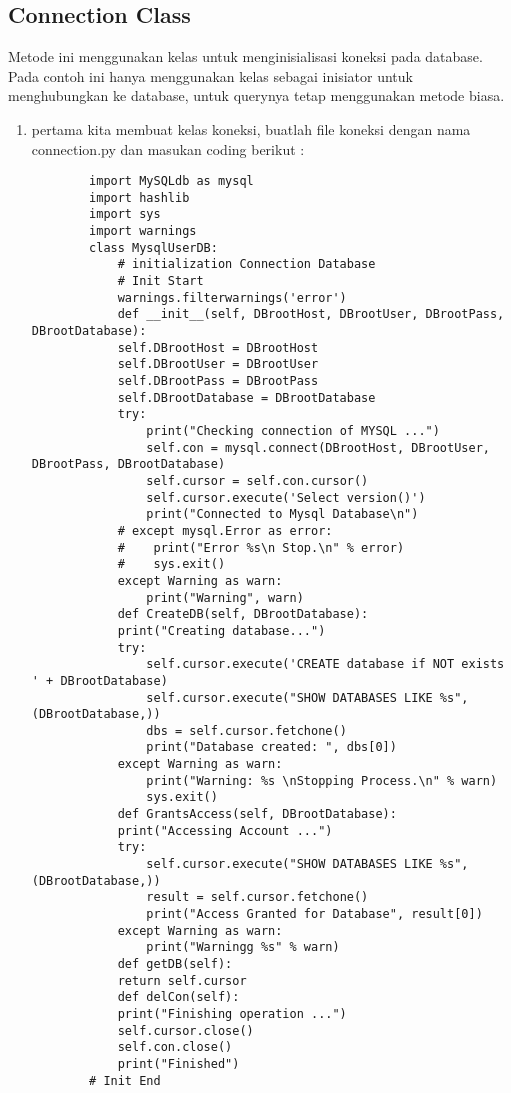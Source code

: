 \begin{enumerate}
\begin{enumerate}
\subsection {Connection Class}
	Metode ini menggunakan kelas untuk menginisialisasi koneksi pada database. Pada contoh ini hanya menggunakan kelas sebagai inisiator untuk menghubungkan ke database, untuk querynya tetap menggunakan metode biasa.
	\begin{enumerate}
	\item pertama kita membuat kelas koneksi, buatlah file koneksi dengan nama connection.py dan masukan coding berikut :
		\begin{verbatim}
		import MySQLdb as mysql
		import hashlib
		import sys
		import warnings
		class MysqlUserDB:
    		# initialization Connection Database
    		# Init Start
    		warnings.filterwarnings('error')
    		def __init__(self, DBrootHost, DBrootUser, DBrootPass, DBrootDatabase):
        	self.DBrootHost = DBrootHost
        	self.DBrootUser = DBrootUser
        	self.DBrootPass = DBrootPass
        	self.DBrootDatabase = DBrootDatabase
        	try:
            	print("Checking connection of MYSQL ...")
            	self.con = mysql.connect(DBrootHost, DBrootUser, DBrootPass, DBrootDatabase)
            	self.cursor = self.con.cursor()
            	self.cursor.execute('Select version()')
            	print("Connected to Mysql Database\n")
        	# except mysql.Error as error:
        	#    print("Error %s\n Stop.\n" % error)
        	#    sys.exit()
        	except Warning as warn:
            	print("Warning", warn)
    		def CreateDB(self, DBrootDatabase):
        	print("Creating database...")
        	try:
            	self.cursor.execute('CREATE database if NOT exists ' + DBrootDatabase)
            	self.cursor.execute("SHOW DATABASES LIKE %s", (DBrootDatabase,))
            	dbs = self.cursor.fetchone()
            	print("Database created: ", dbs[0])
        	except Warning as warn:
            	print("Warning: %s \nStopping Process.\n" % warn)
            	sys.exit()
    		def GrantsAccess(self, DBrootDatabase):
        	print("Accessing Account ...")
        	try:
            	self.cursor.execute("SHOW DATABASES LIKE %s", (DBrootDatabase,))
            	result = self.cursor.fetchone()
            	print("Access Granted for Database", result[0])
        	except Warning as warn:
            	print("Warningg %s" % warn)
    		def getDB(self):
        	return self.cursor
    		def delCon(self):
        	print("Finishing operation ...")
        	self.cursor.close()
        	self.con.close()
        	print("Finished")
		# Init End
		\end{verbatim}


\end{enumerate}
\end{enumerate}
\end{enumerate}
